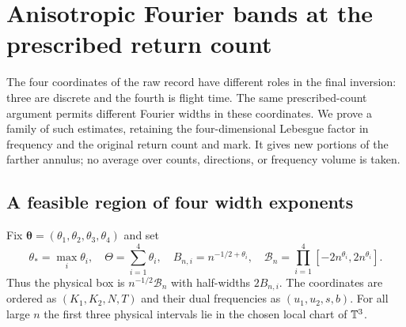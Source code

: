 \section{Anisotropic Fourier bands at the prescribed return count}
\label{sec:anisotropic-fixed-count-bands}
The four coordinates of the raw record have different roles in the
final inversion: three are discrete and the fourth is flight time.
The same prescribed-count argument permits different Fourier widths
in these coordinates. We prove a family of such estimates, retaining
the four-dimensional Lebesgue factor in frequency and the original
return count and mark. It gives new portions of the farther annulus;
no average over counts, directions, or frequency volume is taken.

\subsection{A feasible region of four width exponents}
Fix $\boldsymbol\theta=(\theta_1,\theta_2,\theta_3,\theta_4)$ and set
\begin{equation}\label{eq:anisotropic-widths}
 \theta_* =\max_i\theta_i,\quad \Theta=\sum_{i=1}^4\theta_i,
 \quad B_{n,i}=n^{-1/2+\theta_i},\quad
 \mathcal B_n=\prod_{i=1}^4[-2n^{\theta_i},2n^{\theta_i}].
\end{equation}
Thus the physical box is $n^{-1/2}\mathcal B_n$ with half-widths
$2B_{n,i}$. The coordinates are ordered as
$(K_1,K_2,N,T)$ and their dual frequencies as $(u_1,u_2,s,b)$.
For all large $n$ the first three physical intervals lie in the
chosen local chart of $\mathbb T^3$.

